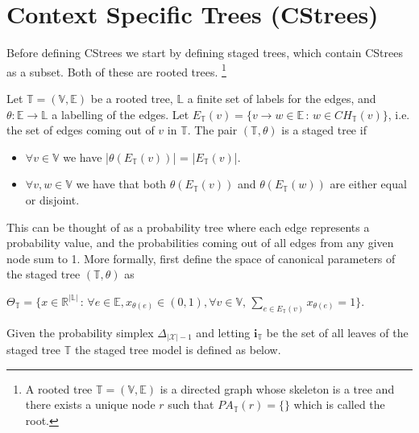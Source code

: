 \documentclass{tufte-book}
\begin{document}
\section{Context Specific Trees (CStrees)}
\label{sec:org9a9ed72}
Before defining CStrees we start by defining staged trees, which contain CStrees as a subset. Both of these are rooted trees.  \footnote{A rooted tree $\mathbb{T} = (\mathbb{V},\mathbb{E})$ is a directed graph whose skeleton is a tree and there exists a unique node $r$ such that $PA_{\mathbb{T}}(r) = \{\}$ which is called the root.} 
   \begin{definition}
   Let $\mathbb{T} = (\mathbb{V},\mathbb{E})$ be a rooted tree, $\mathbb{L}$ a finite set of labels for the edges, and $\theta : \mathbb{E} \rightarrow \mathbb{L}$ a labelling of the edges. Let $E_{\mathbb{T}}(v) = \{v \rightarrow w \in \mathbb{E} \,:\, w \in CH_{\mathbb{T}}(v) \}$,   i.e. the set of edges coming out of $v$ in $\mathbb{T}$. The pair $(\mathbb{T}, \theta)$ is a staged tree if 
\begin{itemize}
\item  $\forall v \in \mathbb{V}$ we have |$\theta(E_{\mathbb{T}}(v))$| = |$E_{\mathbb{T}}(v)$|.
\item $\forall v,w \in \mathbb{V}$ we have that both $\theta(E_\mathbb{T}(v))$ and $\theta(E_\mathbb{T}(w))$ are either equal or disjoint.
\end{itemize}
\end{definition}

This can be thought of as a probability tree where each edge represents a probability value, and the probabilities coming out of all edges from any given node sum to 1. More formally, first define the space of canonical parameters of the staged tree \((\mathbb{T},\theta)\) as

$\Theta_{\mathbb{T}} = \{  x\in \mathbb{R}^{|\mathbb{L}|} \, : \, \forall e \in \mathbb{E}, x_{\theta(e)}\in (0,1), \forall v \in \mathbb{V}, \, \sum_{e \in E_{\mathbb{T}}(v)} x_{\theta(e)}=1 \}$.

Given the probability simplex \(\Delta_{|\mathcal{X}|-1}\) and letting \(\mathbf{i}_{\mathbb{T}}\) be the set of all leaves of the staged tree \(\mathbb{T}\)  the staged tree model is defined as below.
\end{document}
